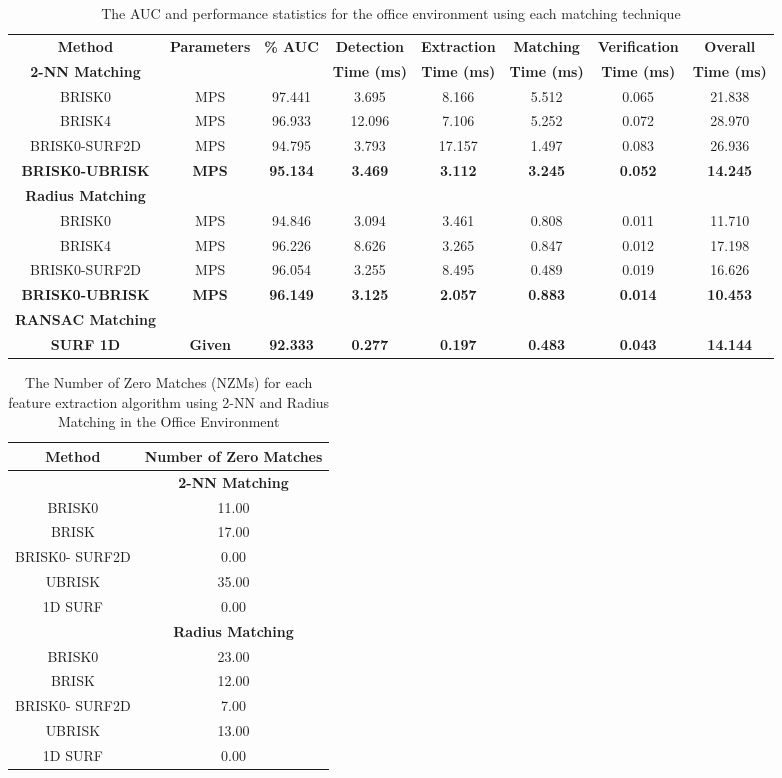 \begin{table}
\centering
\caption{The AUC and performance statistics for the office environment using
each matching technique}

\footnotesize
\begin{tabular}{|c|c|c|c|c|c|c|c|}
\hline 
\textbf{Method } & \textbf{Parameters} & \textbf{\% AUC} & \textbf{Detection} & \textbf{Extraction} & \textbf{Matching} & \textbf{Verification} & \textbf{Overall}\tabularnewline
\textbf{2-NN Matching} &  &  & \textbf{Time (ms)} & \textbf{Time (ms)} & \textbf{Time (ms)} & \textbf{Time (ms)} & \textbf{Time (ms)}\tabularnewline
\hline 
\hline 
BRISK0 & MPS & 97.441 & 3.695 & 8.166 & 5.512 & 0.065 & 21.838\tabularnewline
\hline 
BRISK4 & MPS & 96.933 & 12.096 & 7.106 & 5.252 & 0.072 & 28.970\tabularnewline
\hline 
BRISK0-SURF2D & MPS & 94.795 & 3.793 & 17.157 & 1.497 & 0.083 & 26.936\tabularnewline
\hline 
\textbf{BRISK0-UBRISK} & \textbf{MPS} & \textbf{95.134} & \textbf{3.469} & \textbf{3.112} & \textbf{3.245} & \textbf{0.052} & \textbf{14.245}\tabularnewline
\hline 
\hline 
\textbf{Radius Matching} &  &  &  &  &  &  & \tabularnewline
\hline 
BRISK0 & MPS & 94.846 & 3.094 & 3.461 & 0.808 & 0.011 & 11.710\tabularnewline
\hline 
BRISK4 & MPS & 96.226 & 8.626 & 3.265 & 0.847 & 0.012 & 17.198\tabularnewline
\hline 
BRISK0-SURF2D & MPS & 96.054 & 3.255 & 8.495 & 0.489 & 0.019 & 16.626\tabularnewline
\hline 
\textbf{BRISK0-UBRISK} & \textbf{MPS} & \textbf{96.149} & \textbf{3.125} & \textbf{2.057} & \textbf{0.883} & \textbf{0.014} & \textbf{10.453}\tabularnewline
\hline 
\hline 
\textbf{RANSAC Matching} &  &  &  &  &  &  & \tabularnewline
\hline 
\textbf{SURF 1D} & \textbf{Given} & \textbf{92.333} & \textbf{0.277} & \textbf{0.197} & \textbf{0.483} & \textbf{0.043} & \textbf{14.144}\tabularnewline
\hline 
\end{tabular}
\label{tab:oe_times}
\end{table}

\begin{table}
\centering
\caption{The Number of Zero Matches (NZMs) for each feature extraction algorithm
using 2-NN and Radius Matching in the Office Environment}
\begin{tabular}{|c|c|}
\hline 
\textbf{Method} & \textbf{Number of Zero Matches}\tabularnewline
\hline 
 & \textbf{2-NN Matching}\tabularnewline
\hline 
\hline 
BRISK0 & 11.00\tabularnewline
\hline 
BRISK & 17.00\tabularnewline
\hline 
BRISK0- SURF2D & 0.00\tabularnewline
\hline 
UBRISK & 35.00\tabularnewline
\hline 
1D SURF & 0.00\tabularnewline
\hline 
 & \textbf{Radius Matching}\tabularnewline
\hline 
BRISK0 & 23.00\tabularnewline
\hline 
BRISK & 12.00\tabularnewline
\hline 
BRISK0- SURF2D & 7.00\tabularnewline
\hline 
UBRISK & 13.00\tabularnewline
\hline 
1D SURF & 0.00\tabularnewline
\hline 
\end{tabular}
\label{tab:oe_izm}
\end{table}



